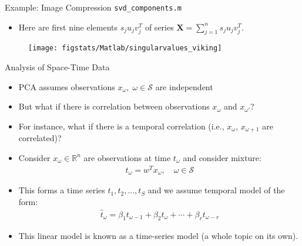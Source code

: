 \documentclass[handout,9pt]{beamer}
\begin{document}
\begin{frame}{Example: Image Compression \footnotesize{\texttt{svd\_components.m}}}

\begin{itemize}
\item Here are first nine elements $s_ju_jv_j^T$ of series $\mathbf{X}=\sum_{j=1}^ns_ju_jv_j^T$. 
\end{itemize}

\begin{figure}[!htb]
    \centering
	\texttt{[image: figstats/Matlab/singularvalues\_viking]}
\end{figure}


\end{frame}

%
\begin{frame}{Analysis of Space-Time Data}

\begin{block}{}
\begin{itemize}
\setlength{\itemsep}{5pt}
\item PCA assumes observations $x_\omega,\; \omega \in \mathcal{S}$ are independent
\item But what if there is correlation between observations $x_\omega$ and $x_{\omega'}$?
\item For instance, what if there is a temporal correlation (i.e., $x_\omega$, $x_{\omega+1}$ are correlated)? 
\end{itemize}
\end{block}

\begin{itemize}
\item Consider $x_\omega\in \mathbb{R}^n$ are observations at time $t_\omega$ and consider mixture:
\begin{align*}
t_\omega=w^Tx_\omega,\quad \omega \in \mathcal{S}
\end{align*}
\item This forms a time series $t_1,t_2,...,t_S$ and we assume temporal model of the form:
\begin{align*}
\hat{t}_\omega=\beta_1t_{\omega-1}+\beta_2t_{\omega}+\cdots+\beta_rt_{\omega-r}
\end{align*}
\item This linear model is known as a time-series model (a whole topic on its own).
\end{itemize}


\end{frame}
\end{document}
